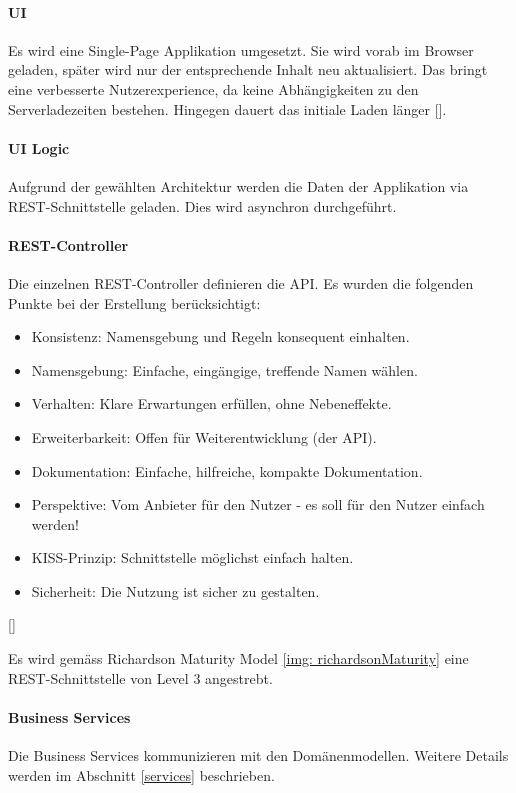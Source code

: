 \paragraph{UI}
Es wird eine Single-Page Applikation umgesetzt. Sie wird vorab im Browser geladen, später wird nur der entsprechende Inhalt neu aktualisiert. Das bringt eine verbesserte Nutzerexperience, da keine Abhängigkeiten zu den Serverladezeiten bestehen. Hingegen dauert das initiale Laden länger [\cite{spa}]. 

\paragraph{UI Logic}
Aufgrund der gewählten Architektur werden die Daten der Applikation via \ac{REST}-Schnittstelle geladen. Dies wird asynchron durchgeführt.

\paragraph{REST-Controller}
Die einzelnen \ac{REST}-Controller definieren die \ac{API}. Es wurden die folgenden Punkte bei der Erstellung berücksichtigt: 
  \begin{itemize}
	\item Konsistenz: Namensgebung und Regeln konsequent einhalten.
	\item Namensgebung: Einfache, eingängige, treffende Namen wählen.
	\item Verhalten: Klare Erwartungen erfüllen, ohne Nebeneffekte.
	\item Erweiterbarkeit: Offen für Weiterentwicklung (der API).
	\item Dokumentation: Einfache, hilfreiche, kompakte Dokumentation.
	\item Perspektive: Vom Anbieter für den Nutzer - es soll für den Nutzer einfach werden!
	\item KISS-Prinzip: Schnittstelle möglichst einfach halten.
	\item Sicherheit: Die Nutzung ist sicher zu gestalten.
\end{itemize}
[\cite{appeAPIDesign}]

Es wird gemäss Richardson Maturity Model \ref{img: richardsonMaturity} eine \ac{REST}-Schnittstelle von Level 3 angestrebt. 

\paragraph{Business Services}
Die Business Services kommunizieren mit den Domänenmodellen. Weitere Details werden im Abschnitt \ref{services} beschrieben. 

